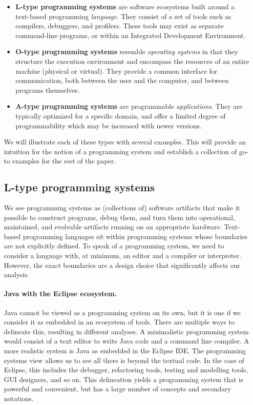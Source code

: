 \begin{itemize}
\item
  \textbf{L-type programming systems} are software ecosystems built
  around a text-based programming \emph{language}. They consist of a set
  of tools such as compilers, debuggers, and profilers. These tools may
  exist as separate command-line programs, or within an Integrated
  Development Environment.
\item
  \textbf{O-type programming systems} resemble \emph{operating systems}
  in that they structure the execution environment and encompass the
  resources of an entire machine (physical or virtual). They provide a
  common interface for communication, both between the user and the
  computer, and between programs themselves.
\item
  \textbf{A-type programming systems} are programmable
  \emph{applications}. They are typically optimized for a specific
  domain, and offer a limited degree of programmability which may be
  increased with newer versions.
\end{itemize}

We will illustrate each of these types with several examples. This will
provide an intuition for the notion of a programming system and
establish a collection of go-to examples for the rest of the paper.

\hypertarget{l-type-programming-systems}{%
\subsection{L-type programming
systems}\label{l-type-programming-systems}}

We see programming systems as (collections of) software artifacts that
make it possible to construct programs, debug them, and turn them into
operational, maintained, and evolvable artifacts running on an
appropriate hardware. Text-based programming languages sit within
programming systems whose boundaries are not explicitly defined. To
speak of a programming system, we need to consider a language with, at
minimum, an editor and a compiler or interpreter. However, the exact
boundaries are a design choice that significantly affects our analysis.

\paragraph{Java with the Eclipse ecosystem.}

Java cannot be viewed as a programming system on its own, but it is one
if we consider it as embedded in an ecosystem of tools. There are
multiple ways to delineate this, resulting in different analyses. A
minimalistic programming system would consist of a text editor to write
Java code and a command line compiler. A more realistic system is Java
as embedded in the Eclipse IDE. The programming systems view allows us
to see all there is beyond the textual code. In the case of Eclipse,
this includes the debugger, refactoring tools, testing and modelling
tools, GUI designers, and so on. This delineation yields a programming
system that is powerful and convenient, but has a large number of
concepts and secondary notations.

